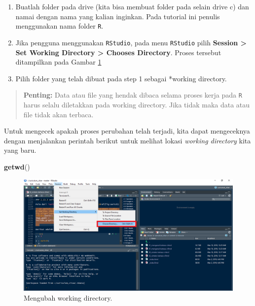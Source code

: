 \documentclass[]{book}
\newenvironment{Shaded}{\begin{snugshade}}{\end{snugshade}}
\newcommand{\KeywordTok}[1]{\textcolor[rgb]{0.13,0.29,0.53}{\textbf{#1}}}
\newcommand{\NormalTok}[1]{#1}
\providecommand{\tightlist}{%
  \setlength{\itemsep}{0pt}\setlength{\parskip}{0pt}}
\theoremstyle{definition}
\theoremstyle{definition}
\theoremstyle{definition}
\theoremstyle{remark}
\begin{document}
\begin{enumerate}
\def\labelenumi{\arabic{enumi}.}
\tightlist
\item
  Buatlah folder pada drive (kita bisa membuat folder pada selain drive c) dan namai dengan nama yang kalian inginkan. Pada tutorial ini penulis menggunakan nama folder \texttt{R}.
\item
  Jika pengguna menggunakan \texttt{RStudio}, pada menu \texttt{RStudio} pilih \textbf{Session \textgreater{} Set Working Directory \textgreater{} Chooses Directory}. Proses tersebut ditampilkan pada Gambar \ref{fig:working}
\item
  Pilih folder yang telah dibuat pada step 1 sebagai *working directory.
\end{enumerate}

\begin{quote}
\textbf{Penting:} Data atau file yang hendak dibaca selama proses kerja pada \texttt{R} harus selalu diletakkan pada working directory. Jika tidak maka data atau file tidak akan terbaca.
\end{quote}

Untuk mengecek apakah proses perubahan telah terjadi, kita dapat mengeceknya dengan menjalankan perintah berikut untuk melihat lokasi \emph{working directory} kita yang baru.

\begin{Shaded}
\begin{Highlighting}[]
\KeywordTok{getwd}\NormalTok{()}
\end{Highlighting}
\end{Shaded}

\begin{figure}

{\centering \includegraphics[width=0.8\linewidth]{./images/working} 

}

\caption{Mengubah working directory.}\label{fig:working}
\end{figure}
\end{document}
